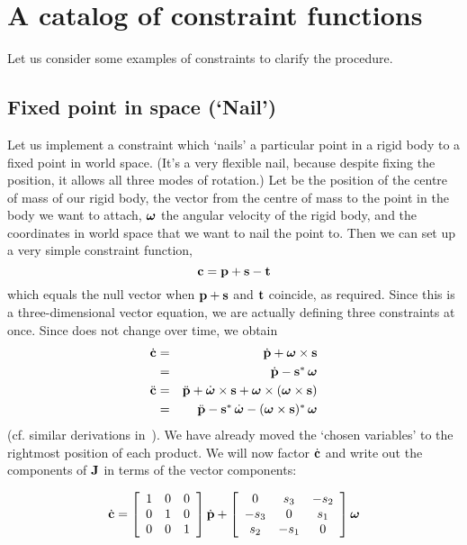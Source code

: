 \section{A catalog of constraint functions\label{constraintAppendix}}

Let us consider some examples of constraints to clarify the procedure.

\subsection{Fixed point in space (`Nail')\label{constrNail}}

Let us implement a constraint which `nails' a particular point in a rigid body to a fixed point
in world space. (It's a very flexible nail, because despite fixing the position, it allows all
three modes of rotation.) Let  be the position of the centre of mass of our rigid
body,  the vector from the centre of mass to the point in the body we want to attach,
$\ve{\omega}$ the angular velocity of the rigid body, and  the coordinates in world
space that we want to nail the point to. Then we can set up a very simple constraint function,
\begin{equation}
\ve{c} = \ve{p} + \ve{s} - \ve{t}
\end{equation}
which equals the null vector when $\ve{p}+\ve{s}$ and $\ve{t}$ coincide, as required.
Since this is a three-dimensional vector equation, we are actually defining three constraints
at once. Since  does not change over time, we obtain
\begin{eqnarray}
\dot{\ve{c}} &=& \dot{\ve{p}} + \ve{\omega}\times\ve{s} \nonumber\\
&=& \dot{\ve{p}} - \dual{\ve{s}}\,\ve{\omega} \\
\ddot{\ve{c}} &=& \ddot{\ve{p}} + \dot{\ve{\omega}}\times\ve{s} +
    \ve{\omega}\times(\ve{\omega}\times\ve{s}) \nonumber\\
&=& \ddot{\ve{p}} - \dual{\ve{s}}\,\dot{\ve{\omega}} -
    \dual{(\ve{\omega}\times\ve{s})}\,\ve{\omega}
\end{eqnarray}
(cf. similar derivations in~\cite{Kalra:95}). We have already moved the `chosen variables' to
the rightmost position of each product. We will now factor $\dot{\ve{c}}$ and write out the
components of $\m{J}$ in terms of the vector components:

\begin{equation}
\label{constrEx1J}
\dot{\ve{c}} = \left[\begin{array}{ccc} 1&0&0\\0&1&0\\0&0&1 \end{array}\right]
    \dot{\ve{p}} + \left[\begin{array}{ccc}
    0 & s_3 & -s_2 \\ -s_3 & 0 & s_1 \\ s_2 & -s_1 & 0
    \end{array}\right] \ve{\omega}
\end{equation}

